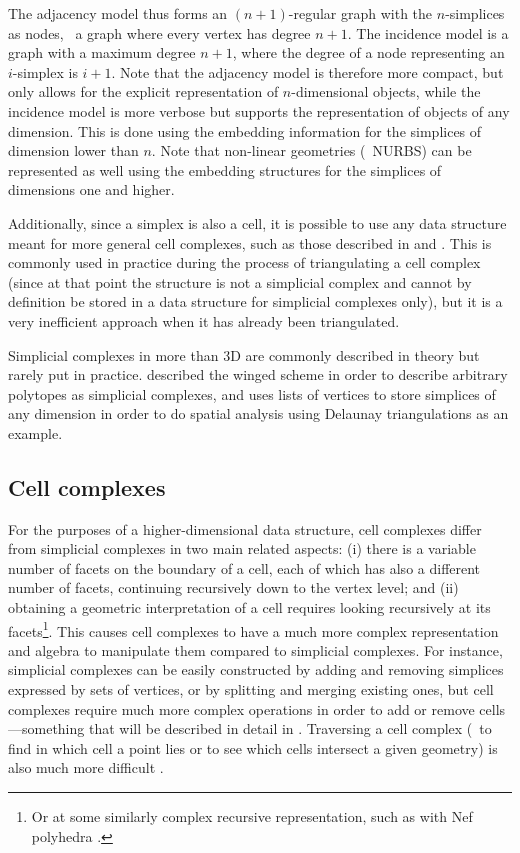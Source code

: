 The adjacency model thus forms an $(n+1)$-regular graph with the $n$-simplices as nodes, \ie\ a graph where every vertex has degree $n+1$.
The incidence model is a graph with a maximum degree $n+1$, where the degree of a node representing an $i$-simplex is $i+1$.
Note that the adjacency model is therefore more compact, but only allows for the explicit representation of $n$-dimensional objects, while the incidence model is more verbose but supports the representation of objects of any dimension.
This is done using the embedding information for the simplices of dimension lower than $n$.
Note that non-linear geometries (\eg\ NURBS) can be represented as well using the embedding structures for the simplices of dimensions one and higher.

Additionally, since a simplex is also a cell, it is possible to use any data structure meant for more general cell complexes, such as those described in  and .
This is commonly used in practice during the process of triangulating a cell complex (since at that point the structure is not a simplicial complex and cannot by definition be stored in a data structure for simplicial complexes only), but it is a very inefficient approach when it has already been triangulated.

Simplicial complexes in more than 3D are commonly described in theory but rarely put in practice.
\citet{Paoluzzi93} described the winged scheme in order to describe arbitrary polytopes as simplicial complexes, and \citet{Karimipour10} uses lists of vertices to store simplices of any dimension in order to do spatial analysis using Delaunay triangulations as an example.

\subsection{Cell complexes}
\label{ss:cell-complexes}

For the purposes of a higher-dimensional data structure, cell complexes differ from simplicial complexes in two main related aspects: (i) there is a variable number of facets on the boundary of a cell, each of which has also a different number of facets, continuing recursively down to the vertex level; and (ii) obtaining a geometric interpretation of a cell requires looking recursively at its facets\footnote{Or at some similarly complex recursive representation, such as with Nef polyhedra \citep{Bieri88}.}.
This causes cell complexes to have a much more complex representation and algebra to manipulate them compared to simplicial complexes.
For instance, simplicial complexes can be easily constructed by adding and removing simplices expressed by sets of vertices, or by splitting and merging existing ones, but cell complexes require much more complex operations in order to add or remove cells---something that will be described in detail in .
Traversing a cell complex (\eg\ to find in which cell a point lies or to see which cells intersect a given geometry) is also much more difficult \citep{deBerg97}.

